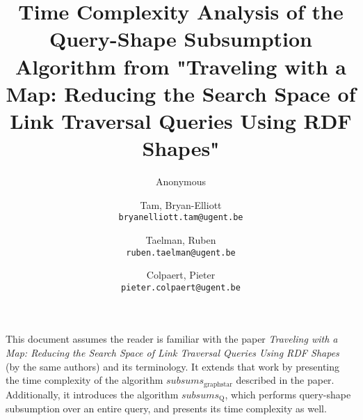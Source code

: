 \documentclass{article}
\title{Time Complexity Analysis of the Query-Shape Subsumption Algorithm from "Traveling with a Map: Reducing the Search Space of Link Traversal Queries Using RDF Shapes"}
\author{Anonymous}
\author{Tam, Bryan-Elliott \\
        \texttt{bryanelliott.tam@ugent.be}
        \and 
        Taelman, Ruben \\
        \texttt{ruben.taelman@ugent.be}
        \and
        Colpaert, Pieter \\
        \texttt{pieter.colpaert@ugent.be}
    }
\begin{document}
\maketitle

This document assumes the reader is familiar with the paper \textit{Traveling with a Map: Reducing the Search Space of Link Traversal Queries Using RDF Shapes} (by the same authors) and its terminology.
It extends that work by presenting the time complexity of the algorithm $subsums_{\mathrm{graph star}}$ described in the paper.
Additionally, it introduces the algorithm $subsums_{\mathrm{Q}}$, which performs query-shape subsumption over an entire query, and presents its time complexity as well.


\end{document}
